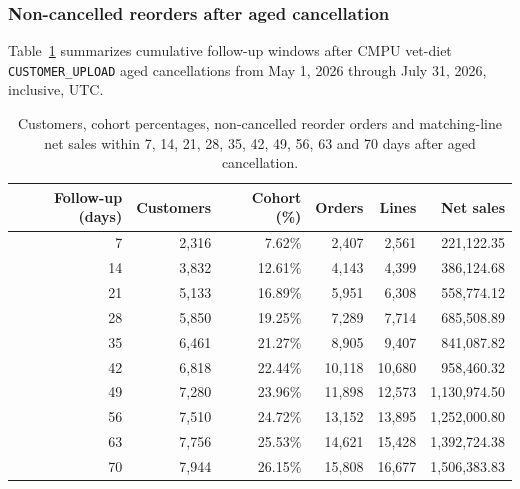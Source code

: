 \clearpage
\subsubsection{Non-cancelled reorders after aged cancellation}
Table~\ref{tab:financial-opportunity-reorder-windows} summarizes cumulative
follow-up windows after CMPU vet-diet \texttt{CUSTOMER\_UPLOAD} aged cancellations
from May 1, 2026 through July 31, 2026, inclusive, UTC.

\begin{table}[!htbp]
\centering
\caption{Customers, cohort percentages, non-cancelled reorder orders and matching-line net sales within 7, 14, 21, 28, 35, 42, 49, 56, 63 and 70 days after aged cancellation.}
\label{tab:financial-opportunity-reorder-windows}
\begin{tabular}{@{}rrrrrr@{}}
\toprule
Follow-up (days) & Customers & Cohort (\%) & Orders & Lines & Net sales \\
\midrule
7 & 2,316 & 7.62\% & 2,407 & 2,561 & 221,122.35 \\
14 & 3,832 & 12.61\% & 4,143 & 4,399 & 386,124.68 \\
21 & 5,133 & 16.89\% & 5,951 & 6,308 & 558,774.12 \\
28 & 5,850 & 19.25\% & 7,289 & 7,714 & 685,508.89 \\
35 & 6,461 & 21.27\% & 8,905 & 9,407 & 841,087.82 \\
42 & 6,818 & 22.44\% & 10,118 & 10,680 & 958,460.32 \\
49 & 7,280 & 23.96\% & 11,898 & 12,573 & 1,130,974.50 \\
56 & 7,510 & 24.72\% & 13,152 & 13,895 & 1,252,000.80 \\
63 & 7,756 & 25.53\% & 14,621 & 15,428 & 1,392,724.38 \\
70 & 7,944 & 26.15\% & 15,808 & 16,677 & 1,506,383.83 \\
\bottomrule
\end{tabular}


\end{table}
